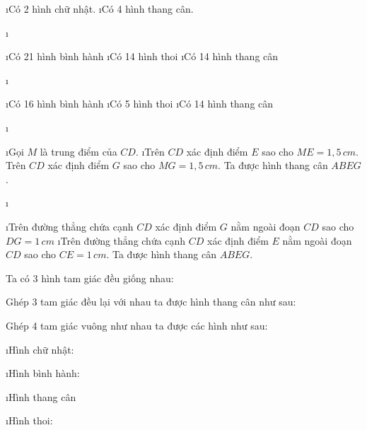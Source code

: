 \begin{Answer}{7}
		\begin{enumerate}[--, leftmargin=*]
			\i Có 2 hình chữ nhật.
			\i Có 4 hình thang cân.
		\end{enumerate}
	
\end{Answer}
\begin{Answer}{8}
		\begin{enumerate}[a), leftmargin=*]
			\i \begin{enumerate}[--, leftmargin=*]
				\i Có 21 hình bình hành
				\i Có 14 hình thoi
				\i Có 14 hình thang cân
				\end{enumerate}
			\i \begin{enumerate}[--, leftmargin=*]
				\i Có 16 hình bình hành
				\i Có 5 hình thoi
				\i Có 14 hình thang cân
			\end{enumerate}
		\end{enumerate}
	
\end{Answer}
\begin{Answer}{9}
		\begin{enumerate}[a), leftmargin=*]
			\i \begin{enumerate}[Bước 1:, leftmargin=*]
				\i Gọi $M$ là trung điểm của  $CD$.
				\i Trên $CD$ xác định điểm $E$ sao cho $ME = 1,5\,cm$. Trên $CD$ xác định điểm $G$  sao cho $MG = 1,5\, cm$.  Ta được hình thang cân $ABEG$.
				\end{enumerate}
			\i \begin{enumerate}[Bước 1:, leftmargin=*]
				\i Trên đường thẳng chứa cạnh $CD$ xác định điểm $G$ nằm ngoài đoạn $CD$ sao cho $DG = 1\,cm$
				\i Trên đường thẳng chứa cạnh $CD$ xác định điểm $E$ nằm ngoài đoạn $CD$ sao cho $CE =1\, cm$. Ta được hình thang cân  $ABEG$.
			\end{enumerate}
		\end{enumerate}
	
\end{Answer}
\begin{Answer}{10}
		Ta có 3 hình tam giác đều giống nhau:
		
		
		Ghép 3 tam giác đều lại với nhau ta được hình thang cân như sau:
		
	
\end{Answer}
\begin{Answer}{11}
		Ghép 4 tam giác vuông như nhau ta được các hình như sau:
		\begin{enumerate}[a), leftmargin=*]
			\i Hình chữ nhật:
			
			\i Hình bình hành:
			
			\i Hình thang cân
			
			\i Hình thoi:
		\end{enumerate}
		
	
\end{Answer}
